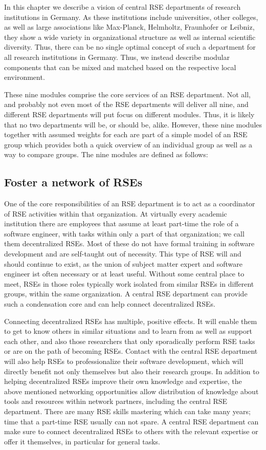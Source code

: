 \documentclass{article}
\begin{document}
In this chapter we describe a vision of central RSE departments of research institutions in Germany.
As these institutions include universities, other colleges, as well as large associations like Max-Planck, Helmholtz, Fraunhofer or Leibniz, they show a wide variety in organizational structure as well as internal scientific diversity.
Thus, there can be no single optimal concept of such a department for all research institutions in Germany.
Thus, we instead describe modular components that can be mixed and matched based on the respective local environment.

These nine modules comprise the core services of an RSE department.
Not all, and probably not even most of the RSE departments will deliver all nine, and different RSE departments will put focus on different modules.
Thus, it is likely that no two departments will be, or should be, alike.
However, these nine modules together with assumed weights for each are part of a simple model of an RSE group which provides both a quick overview of an individual group as well as a way to compare groups.
The nine modules are defined as follows:

\subsection{Foster a network of RSEs}

One of the core responsibilities of an RSE department is to act as a coordinator of RSE activities within that organization.
At virtually every academic institution there are employees that assume at least part-time the role of a software engineer, with tasks within only a part of that organization; we call them decentralized RSEs.
Most of these do not have formal training in software development and are self-taught out of necessity.
This type of RSE will and should continue to exist, as the union of subject matter expert and software engineer ist often necessary or at least useful.
Without some central place to meet, RSEs in those roles typically work isolated from similar RSEs in different groups, within the same organization.
A central RSE department can provide such a condensation core and can help connect decentralized RSEs.

Connecting decentralized RSEs has multiple, positive effects.
It will enable them to get to know others in similar situations and to learn from as well as support each other, and also those researchers that only sporadically perform RSE tasks or are on the path of becoming RSEs.
Contact with the central RSE department will also help RSEs to professionalize their software development, which will directly benefit not only themselves but also their research groups.
In addition to helping decentralized RSEs improve their own knowledge and expertise, the above mentioned networking opportunities allow distribution of knowledge about tools and resources within network partners, including the central RSE department.
There are many RSE skills mastering which can take many years; time that a part-time RSE usually can not spare.
A central RSE department can make sure to connect decentralized RSEs to others with the relevant expertise or offer it themselves, in particular for general tasks.
\end{document}
